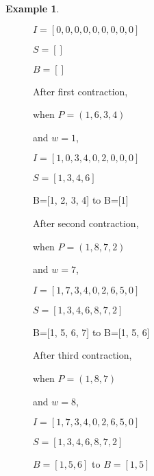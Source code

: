 \documentclass{report}
\theoremstyle{plain}
\theoremstyle{definition}
\newtheorem{example}{Example}
\theoremstyle{remark}
\numberwithin{definition}{chapter}
\numberwithin{example}{chapter}
\numberwithin{figure}{chapter}
\begin{document}
{{{{{{{{{\begin{example}
\begin{figure}[h]
\begin{minipage}[h]{0.24\textwidth}
$I=[0, 0, 0, 0, 0, 0, 0, 0, 0]$

$S=[]$

$B=[]$

\end{minipage}
\hfill
{}

After first contraction,

when $P=(1,6,3,4)$

and $w=1$,

$I=[1, 0, 3, 4, 0, 2, 0, 0, 0]$

$S=[1, 3, 4, 6]$

B=[1, 2, 3, 4] to B=[1]
\endminipage\hfill
{}

After second contraction,

when $P=(1,8,7,2)$

and $w=7$,

$I=[1, 7, 3, 4, 0, 2, 6, 5, 0]$

$S=[1, 3, 4, 6, 8, 7, 2]$

B=[1, 5, 6, 7] to B=[1, 5, 6]
\endminipage\hfill
{}

After third contraction,

when $P=(1,8,7)$

and $w=8$,

$I=[1, 7, 3, 4, 0, 2, 6, 5, 0]$

$S=[1, 3, 4, 6, 8, 7, 2]$

$B=[1, 5, 6]$ to $B=[1, 5]$
\endminipage\hfill


\end{figure}
\end{example}}}}}}}}}}
\end{document}
